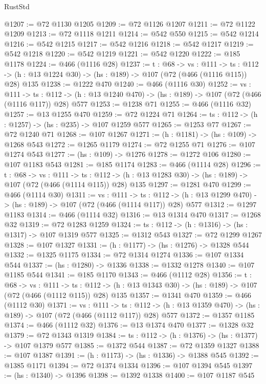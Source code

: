 \begin{lexlean}{RustStd}
\begin{coremodule}
{\begin{coremodule}
{{{{@1207 := @72 @1130 @1205
@1209 := @72 @1126 @1207
@1211 := @72 @1122 @1209
@1213 := @72 @1118 @1211
@1214 := @542 @550
@1215 := @542 @1214
@1216 := @542 @1215
@1217 := @542 @1216
@1218 := @542 @1217
@1219 := @542 @1218
@1220 := @542 @1219
@1221 := @542 @1220
@1222 := @185 @1178
@1224 := @466 (@1116 @28)
@1237 := {t : @68} ->
  {vs : @111} ->
  {ts : @112} -> (h : @13 @1224 @30) -> (hs : @189) -> @107 (@72 (@466 (@1116 @115)) @28) @135
@1238 := @1222 @470
@1240 := @466 (@1116 @30)
@1252 := {vs : @111} ->
  {ts : @112} -> (h : @13 @1240 @470) -> (hs : @189) -> @107 (@72 (@466 (@1116 @117)) @28) @577
@1253 := @1238 @71
@1255 := @466 (@1116 @32)
@1257 := @13 @1255 @470
@1259 := @72 @1224 @71
@1264 := {ts : @112} -> (h : @1257) -> (hs : @235) -> @107 @1259 @577
@1265 := @1253 @77
@1267 := @72 @1240 @71
@1268 := @107 @1267
@1271 := (h : @1181) -> (hs : @109) -> @1268 @543
@1272 := @1265 @1179
@1274 := @72 @1255 @71
@1276 := @107 @1274 @543
@1277 := (hs : @109) -> @1276
@1278 := @1272 @106
@1280 := @107 @1183 @543
@1281 := @185 @1174
@1283 := @466 (@1114 @28)
@1296 := {t : @68} ->
  {vs : @111} ->
  {ts : @112} -> (h : @13 @1283 @30) -> (hs : @189) -> @107 (@72 (@466 (@1114 @115)) @28) @135
@1297 := @1281 @470
@1299 := @466 (@1114 @30)
@1311 := {vs : @111} ->
  {ts : @112} -> (h : @13 @1299 @470) -> (hs : @189) -> @107 (@72 (@466 (@1114 @117)) @28) @577
@1312 := @1297 @1183
@1314 := @466 (@1114 @32)
@1316 := @13 @1314 @470
@1317 := @1268 @32
@1319 := @72 @1283 @1259
@1324 := {ts : @112} -> (h : @1316) -> (hs : @1317) -> @107 @1319 @577
@1325 := @1312 @543
@1327 := @72 @1299 @1267
@1328 := @107 @1327
@1331 := (h : @1177) -> (hs : @1276) -> @1328 @544
@1332 := @1325 @1175
@1334 := @72 @1314 @1274
@1336 := @107 @1334 @544
@1337 := (hs : @1280) -> @1336
@1338 := @1332 @1278
@1340 := @107 @1185 @544
@1341 := @185 @1170
@1343 := @466 (@1112 @28)
@1356 := {t : @68} ->
  {vs : @111} ->
  {ts : @112} -> (h : @13 @1343 @30) -> (hs : @189) -> @107 (@72 (@466 (@1112 @115)) @28) @135
@1357 := @1341 @470
@1359 := @466 (@1112 @30)
@1371 := {vs : @111} ->
  {ts : @112} -> (h : @13 @1359 @470) -> (hs : @189) -> @107 (@72 (@466 (@1112 @117)) @28) @577
@1372 := @1357 @1185
@1374 := @466 (@1112 @32)
@1376 := @13 @1374 @470
@1377 := @1328 @32
@1379 := @72 @1343 @1319
@1384 := {ts : @112} -> (h : @1376) -> (hs : @1377) -> @107 @1379 @577
@1385 := @1372 @544
@1387 := @72 @1359 @1327
@1388 := @107 @1387
@1391 := (h : @1173) -> (hs : @1336) -> @1388 @545
@1392 := @1385 @1171
@1394 := @72 @1374 @1334
@1396 := @107 @1394 @545
@1397 := (hs : @1340) -> @1396
@1398 := @1392 @1338
@1400 := @107 @1187 @545
}}}}
\end{coremodule}}
\end{coremodule}
\end{lexlean}
